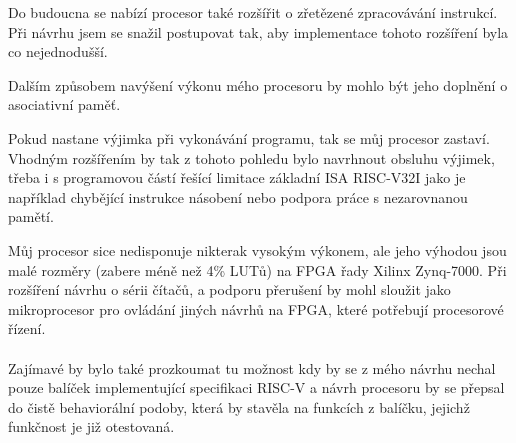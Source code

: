 \documentclass[FM,BP]{tulthesis}
\begin{document}
Do budoucna se nabízí procesor také rozšířit o zřetězené zpracovávání instrukcí. Při návrhu jsem se snažil postupovat tak, aby implementace tohoto rozšíření byla co nejednodušší. 

Dalším způsobem navýšení výkonu mého procesoru by mohlo být jeho doplnění o asociativní paměť.

Pokud nastane výjimka při vykonávání programu, tak se můj procesor zastaví. Vhodným rozšířením by tak z tohoto pohledu bylo navrhnout obsluhu výjimek, třeba i s programovou částí řešící limitace základní ISA RISC-V32I jako je například chybějící instrukce násobení nebo podpora práce s nezarovnanou pamětí.

Můj procesor sice nedisponuje nikterak vysokým výkonem, ale jeho výhodou jsou malé rozměry (zabere méně než 4\% LUTů) na FPGA řady Xilinx Zynq-7000. Při rozšíření návrhu o sérii čítačů, a podporu přerušení by mohl sloužit jako mikroprocesor pro ovládání jiných návrhů na FPGA, které potřebují procesorové řízení. 

\paragraph{}
Zajímavé by bylo také prozkoumat tu možnost kdy by se z mého návrhu nechal pouze balíček implementující specifikaci RISC-V a návrh procesoru by se přepsal do čistě behaviorální podoby, která by stavěla na funkcích z balíčku, jejichž funkčnost je již otestovaná. 

\appendix






\end{document}
